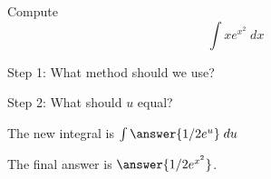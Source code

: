 \documentclass{ximera}
\begin{document}
\begin{center}
\begin{foldable}
\end{foldable}
\end{center}




\begin{problem}
Compute 
\[
\int xe^{x^2} \; dx
\]

\begin{question}
Step 1: What method should we use?
\begin{multipleChoice}
\end{multipleChoice}

\begin{question}
Step 2: What should $u$ equal?
\begin{multipleChoice}
\end{multipleChoice}

\begin{question}
The new integral is $\int \answer{1/2 e^u} \; du$

\begin{question}
The final answer is $\answer{1/2 e^{x^2}}$.

\end{question}
\end{question}
\end{question}
\end{question}

\end{problem}
\end{document}
